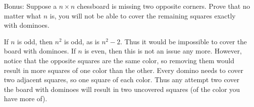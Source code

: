 \documentclass[10pt]{exam}
\begin{document}
\begin{questions}
\begin{parts}
\begin{center}
  \end{center}

  \end{parts}


  \bonusquestion[4] Bonus: Suppose a $n\times n$ chessboard is missing two opposite corners.  Prove that no matter what $n$ is, you will not be able to cover the remaining squares exactly with dominoes.

  \begin{center}
  \end{center}

  \begin{solution}
  If $n$ is odd, then $n^2$ is odd, as is $n^2 - 2$.  Thus it would be impossible to cover the board with dominoes.  If $n$ is even, then this is not an issue any more.  However, notice that the opposite squares are the same color, so removing them would result in more squares of one color than the other.  Every domino needs to cover two adjacent squares, so one square of each color.  Thus any attempt two cover the board with dominoes will result in two uncovered squares (of the color you have more of).
  \end{solution}
\end{questions}
\end{document}
